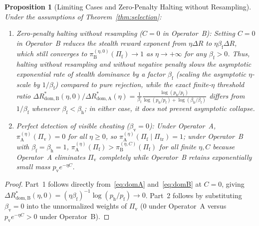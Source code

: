 \documentclass[11pt,a4paper]{article}
\newtheorem{proposition}[theorem]{Proposition}
\begin{document}
\begin{proposition}[Limiting Cases and Zero-Penalty Halting without Resampling]\label{prop:limits}
Under the assumptions of Theorem~\ref{thm:selection}:
\begin{enumerate}
  \item \emph{Zero-penalty halting without resampling ($C = 0$ in Operator~B):} Setting $C = 0$ in Operator~B reduces the stealth reward exponent from $\eta\Delta R$ to $\eta\beta_{\mathrm{f}}\Delta R$, which still converges to $\pi_{\mathrm{B}}^{(\eta, 0)}(\Pi_{\mathrm{f}}) \to 1$ as $\eta \to +\infty$ for any $\beta_{\mathrm{f}} > 0$. Thus, halting without resampling and without negative penalty slows the asymptotic exponential rate of stealth dominance by a factor $\beta_{\mathrm{f}}$ (scaling the asymptotic $\eta$-scale by $1/\beta_{\mathrm{f}}$) compared to pure rejection, while the exact finite-$\eta$ threshold ratio $\Delta R_{\mathrm{dom, B}}^*(\eta, 0)/\Delta R_{\mathrm{dom, A}}^*(\eta) = \frac{1}{\beta_{\mathrm{f}}}\frac{\log(p_{\mathrm{h}}/p_{\mathrm{f}})}{\log(p_{\mathrm{h}}/p_{\mathrm{f}}) + \log(\beta_{\mathrm{h}}/\beta_{\mathrm{f}})}$ differs from $1/\beta_{\mathrm{f}}$ whenever $\beta_{\mathrm{f}} < \beta_{\mathrm{h}}$; in either case, it does not prevent asymptotic collapse.
  \item \emph{Perfect detection of visible cheating ($\beta_{\mathrm{v}} = 0$):} Under Operator~A, $\pi_{\mathrm{A}}^{(\eta)}(\Pi_{\mathrm{v}}) = 0$ for all $\eta \ge 0$, so $\pi_{\mathrm{A}}^{(\eta)}(\Pi_{\mathrm{f}} \mid \Pi_{\mathrm{tr}}) = 1$; under Operator~B with $\beta_{\mathrm{f}} = \beta_{\mathrm{h}} = 1$, $\pi_{\mathrm{A}}^{(\eta)}(\Pi_{\mathrm{f}}) > \pi_{\mathrm{B}}^{(\eta, C)}(\Pi_{\mathrm{f}})$ for all finite $\eta, C$ because Operator~A eliminates $\Pi_{\mathrm{v}}$ completely while Operator~B retains exponentially small mass $p_{\mathrm{v}} e^{-\eta C}$.
\end{enumerate}
\end{proposition}

\begin{proof}
Part~1 follows directly from~\eqref{eq:domA} and~\eqref{eq:domB} at $C = 0$, giving $\Delta R_{\mathrm{dom, B}}^*(\eta, 0) = (\eta\beta_{\mathrm{f}})^{-1}\log(p_{\mathrm{h}}/p_{\mathrm{f}}) \to 0$. Part~2 follows by substituting $\beta_{\mathrm{v}} = 0$ into the unnormalized weights of $\Pi_{\mathrm{v}}$ ($0$ under Operator~A versus $p_{\mathrm{v}} e^{-\eta C} > 0$ under Operator~B).
\end{proof}
\end{document}
